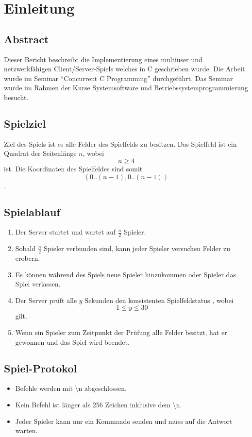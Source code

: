 


\chapter{Einleitung}

\section{Abstract}
\label{abstract}
Dieser Bericht beschreibt die Implementierung eines multiuser und netzwerkfähigen Client/Server-Spiels welches in C geschrieben wurde. Die Arbeit wurde im Seminar ``Concurrent C Programming'' durchgeführt. Das Seminar wurde im Rahmen der Kurse Systemsoftware und Betriebssystemprogrammierung besucht.

\section{Spielziel}
Ziel des Spiels ist es alle Felder des Spielfelds zu besitzen. Das Spielfeld ist ein Quadrat der Seitenlänge $n$, wobei $$n \geq  4$$ ist. Die Koordinaten des Spielfeldes sind somit $$(0..(n-1), 0..(n-1))$$.

\section{Spielablauf}
\begin{enumerate}
	\item Der Server startet und wartet auf $\frac{n}{2}$ Spieler.
	\item Sobald $\frac{n}{2}$ Spieler verbunden sind, kann jeder Spieler versuchen Felder zu erobern.
	\item Es können während des Spiels neue Spieler hinzukommen oder Spieler das Spiel verlassen.
	\item Der Server prüft alle $y$ Sekunden den konsistenten Spielfeldstatus , wobei $$1 \leq y \leq 30$$ gilt.
	\item Wenn ein Spieler zum Zeitpunkt der Prüfung alle Felder besitzt, hat er gewonnen und das Spiel wird beendet.
\end{enumerate}

\section{Spiel-Protokol}
\begin{itemize}
	\item Befehle werden mit \textbackslash n abgeschlossen.
	\item Kein Befehl ist länger als 256 Zeichen inklusive dem \textbackslash n.
	\item Jeder Spieler kann nur ein Kommando senden und muss auf die Antwort warten.
\end{itemize}

